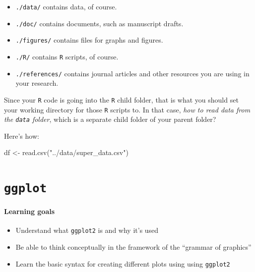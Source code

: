 \documentclass[
]{book}
\newenvironment{Shaded}{\begin{snugshade}}{\end{snugshade}}
\newcommand{\FunctionTok}[1]{\textcolor[rgb]{0.00,0.00,0.00}{#1}}
\newcommand{\NormalTok}[1]{#1}
\newcommand{\OtherTok}[1]{\textcolor[rgb]{0.56,0.35,0.01}{#1}}
\newcommand{\StringTok}[1]{\textcolor[rgb]{0.31,0.60,0.02}{#1}}
\providecommand{\tightlist}{%
  \setlength{\itemsep}{0pt}\setlength{\parskip}{0pt}}
\begin{document}
\begin{itemize}
\tightlist
\item
  \texttt{./data/} contains data, of course.
\item
  \texttt{./doc/} contains documents, such as manuscript drafts.
\item
  \texttt{./figures/} contains files for graphs and figures.
\item
  \texttt{./R/} contains \texttt{R} scripts, of course.
\item
  \texttt{./references/} contains journal articles and other resources you are using in your research.
\end{itemize}

Since your \texttt{R} code is going into the \texttt{R} child folder, that is what you should set your working directory for those \texttt{R} scripts to. In that case, \emph{how to read data from the \texttt{data} folder}, which is a separate child folder of your parent folder?

Here's how:

\begin{Shaded}
\begin{Highlighting}[]
\NormalTok{df }\OtherTok{\textless{}{-}} \FunctionTok{read.csv}\NormalTok{(}\StringTok{"../data/super\_data.csv"}\NormalTok{)}
\end{Highlighting}
\end{Shaded}

\hypertarget{ggplot}{%
\chapter{\texorpdfstring{\texttt{ggplot}}{ggplot}}\label{ggplot}}

\hypertarget{learning-goals-5}{%
\subsubsection*{Learning goals}\label{learning-goals-5}}

\begin{itemize}
\tightlist
\item
  Understand what \texttt{ggplot2} is and why it's used
\item
  Be able to think conceptually in the framework of the ``grammar of graphics''
\item
  Learn the basic syntax for creating different plots using using \texttt{ggplot2}
\end{itemize}
\end{document}
